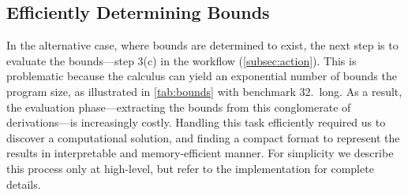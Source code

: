 \documentclass[runningheads]{llncs}
\newcommand{\toolURL}{https://statycc.github.io/.github/pymwp/}{}
\begin{document}
%	





\subsection{Efficiently Determining Bounds} %
\label{subsec:eval}

In the alternative case, where bounds are determined to exist, the next step is to evaluate the bounds---step 3(c) in the \pymwp workflow (\autoref{subsec:action}). 
This is problematic because the calculus can yield an exponential number of bounds \wrt the program size, as illustrated in \autoref{tab:bounds} with \eg benchmark 32.\ long.
As a result, the evaluation phase---\eg extracting the bounds from this conglomerate of derivations---is increasingly costly.
%
Handling this task efficiently required us to discover a computational solution, and finding a compact format to represent the results in  interpretable and memory-efficient manner. For simplicity we describe this process only at high-level, but refer to the implementation for complete details.%
\end{document}
